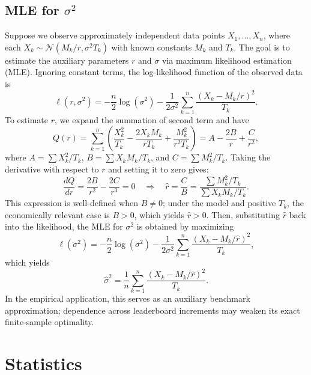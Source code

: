 \documentclass[mnsc]{informs3}
\begin{document}
\begin{APPENDICES}
\subsection{MLE for $\sigma^2$}\label{appexidx-normal-MLE}

Suppose we observe approximately independent data points \( X_1, ..., X_n \), where each \( X_k \sim \mathcal{N}(M_k / r, \sigma^2 T_k) \) with known constants \( M_k \) and \( T_k \).
The goal is to estimate the auxiliary parameters \( r \) and \( \sigma \) via maximum likelihood estimation (MLE).
Ignoring constant terms, the log-likelihood function of the observed data is
\[
\ell(r, \sigma^2) = - \frac{n}{2} \log(\sigma^2) - \frac{1}{2\sigma^2} \sum_{k=1}^n \frac{\left( X_k - M_k/r \right)^2}{T_k}.
\]
To estimate $r$, we expand the summation of second term and have
\[
Q(r) = \sum_{k=1}^n \left( \frac{X_k^2}{T_k} - \frac{2X_k M_k}{r T_k} + \frac{M_k^2}{r^2 T_k} \right)
= A - \frac{2B}{r} + \frac{C}{r^2},
\]
where \( A = \sum X_k^2/T_k \), \( B = \sum X_k M_k/T_k \), and \( C = \sum M_k^2/T_k \). Taking the derivative with respect to \( r \) and setting it to zero gives:
\begin{equation*}
\frac{dQ}{dr} = \frac{2B}{r^2} - \frac{2C}{r^3} = 0 \quad \Rightarrow \quad \hat{r} = \frac{C}{B} = \frac{\sum M_k^2/T_k}{\sum X_k M_k/T_k}.
\end{equation*}
This expression is well-defined when $B\neq 0$; under the model and positive $T_k$, the economically relevant case is $B>0$, which yields $\hat r>0$.
Then, substituting \( \hat{r} \) back into the likelihood, the MLE for \( \sigma^2 \) is obtained by maximizing
\[
\ell(\sigma^2) = -\frac{n}{2} \log(\sigma^2) - \frac{1}{2\sigma^2} \sum_{k=1}^n \frac{\left( X_k - M_k/\hat{r} \right)^2}{T_k},
\]
which yields
\begin{equation}\label{normal-mle-sigma}
\hat{\sigma}^2 = \frac{1}{n} \sum_{k=1}^n \frac{\left( X_k - M_k/\hat{r}\right)^2}{T_k}.
\end{equation}
In the empirical application, this serves as an auxiliary benchmark approximation; dependence across leaderboard increments may weaken its exact finite-sample optimality.








\section{Statistics}\label{appendix-statistics}


\end{APPENDICES}
\end{document}
